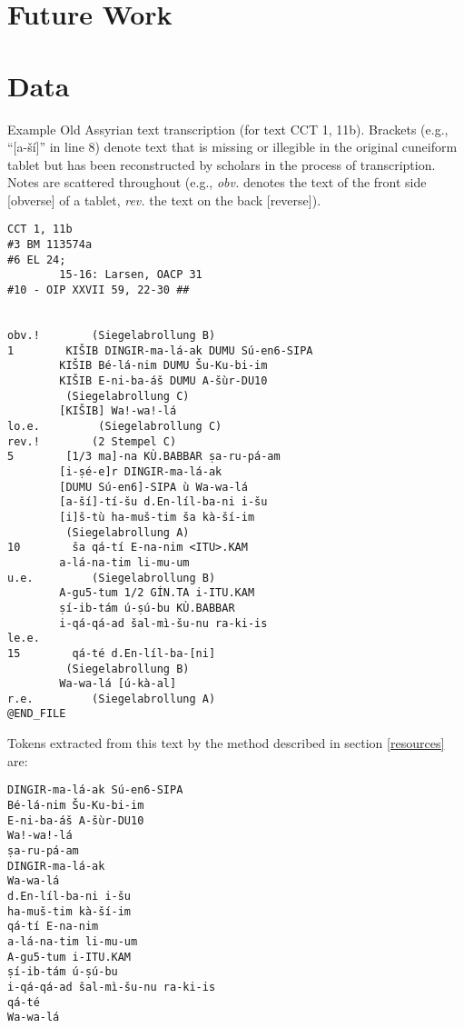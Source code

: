 \documentclass[11pt,letterpaper]{article}
\begin{document}
\section{Future Work}

\appendix
\section{Data}
\label{appendixData}
Example Old Assyrian text transcription (for text CCT 1, 11b). Brackets (e.g., ``[a-ší]'' in line 8) denote text that is missing or illegible in the original cuneiform tablet but has been reconstructed by scholars in the process of transcription.  Notes are scattered throughout (e.g., \emph{obv.} denotes the text of the front side [obverse] of a tablet, \emph{rev.} the text on the back [reverse]).

\begin{verbatim}
CCT 1, 11b
#3 BM 113574a
#6 EL 24;
        15-16: Larsen, OACP 31
#10 - OIP XXVII 59, 22-30 ##


obv.!        (Siegelabrollung B)
1        KIŠIB DINGIR-ma-lá-ak DUMU Sú-en6-SIPA
        KIŠIB Bé-lá-nim DUMU Šu-Ku-bi-im
        KIŠIB E-ni-ba-áš DUMU A-šùr-DU10
         (Siegelabrollung C)
        [KIŠIB] Wa!-wa!-lá
lo.e.         (Siegelabrollung C)
rev.!        (2 Stempel C)
5        [1/3 ma]-na KÙ.BABBAR ṣa-ru-pá-am
        [i-ṣé-e]r DINGIR-ma-lá-ak
        [DUMU Sú-en6]-SIPA ù Wa-wa-lá
        [a-ší]-tí-šu d.En-líl-ba-ni i-šu
        [i]š-tù ha-muš-tim ša kà-ší-im
         (Siegelabrollung A)
10        ša qá-tí E-na-nim <ITU>.KAM
        a-lá-na-tim li-mu-um
u.e.         (Siegelabrollung B)
        A-gu5-tum 1/2 GÍN.TA i-ITU.KAM
        ṣí-ib-tám ú-ṣú-bu KÙ.BABBAR
        i-qá-qá-ad šal-mì-šu-nu ra-ki-is
le.e.
15        qá-té d.En-líl-ba-[ni]
         (Siegelabrollung B)
        Wa-wa-lá [ú-kà-al]
r.e.         (Siegelabrollung A)
@END_FILE

\end{verbatim}

Tokens extracted from this text by the method described in section \ref{resources} are:

\begin{verbatim}
DINGIR-ma-lá-ak Sú-en6-SIPA
Bé-lá-nim Šu-Ku-bi-im
E-ni-ba-áš A-šùr-DU10
Wa!-wa!-lá
ṣa-ru-pá-am
DINGIR-ma-lá-ak
Wa-wa-lá
d.En-líl-ba-ni i-šu
ha-muš-tim kà-ší-im
qá-tí E-na-nim
a-lá-na-tim li-mu-um
A-gu5-tum i-ITU.KAM
ṣí-ib-tám ú-ṣú-bu
i-qá-qá-ad šal-mì-šu-nu ra-ki-is
qá-té
Wa-wa-lá
\end{verbatim}

\nocite{*}




\label{lastpage}
\end{document}
